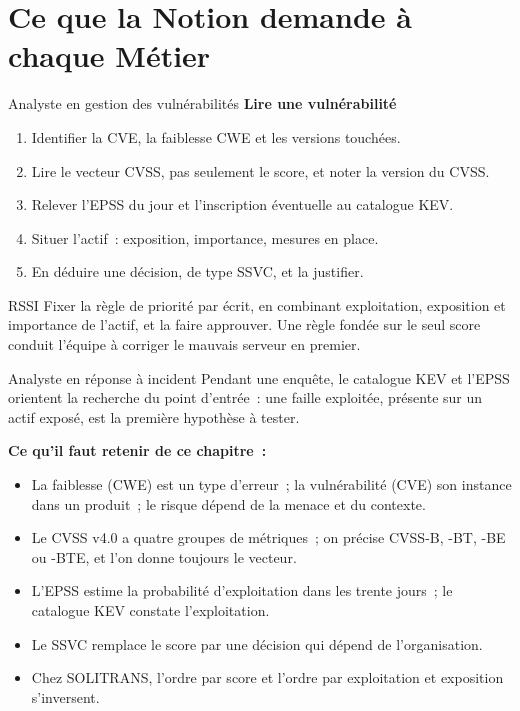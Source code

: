 \section{Ce que la Notion demande à chaque Métier}
\label{sec:c09-metiers}

\begin{boxmetier}{Analyste en gestion des vulnérabilités}
\textbf{Lire une vulnérabilité}
\begin{enumerate}
    \item Identifier la CVE, la faiblesse CWE et les versions touchées.
    \item Lire le vecteur CVSS, pas seulement le score, et noter la version
          du CVSS.
    \item Relever l'EPSS du jour et l'inscription éventuelle au catalogue
          KEV.
    \item Situer l'actif~: exposition, importance, mesures en place.
    \item En déduire une décision, de type SSVC, et la justifier.
\end{enumerate}
\end{boxmetier}

\begin{boxmetier}{RSSI}
Fixer la règle de priorité par écrit, en combinant exploitation, exposition
et importance de l'actif, et la faire approuver. Une règle fondée sur le
seul score conduit l'équipe à corriger le mauvais serveur en premier.
\end{boxmetier}

\begin{boxmetier}{Analyste en réponse à incident}
Pendant une enquête, le catalogue KEV et l'EPSS orientent la recherche du
point d'entrée~: une faille exploitée, présente sur un actif exposé, est la
première hypothèse à tester.
\end{boxmetier}

\separateur

\begin{boxresume}
\textbf{Ce qu'il faut retenir de ce chapitre~:}
\begin{itemize}
    \item La faiblesse (CWE) est un type d'erreur~; la vulnérabilité (CVE)
          son instance dans un produit~; le risque dépend de la menace et
          du contexte.
    \item Le CVSS v4.0 a quatre groupes de métriques~; on précise CVSS-B,
          -BT, -BE ou -BTE, et l'on donne toujours le vecteur.
    \item L'EPSS estime la probabilité d'exploitation dans les trente
          jours~; le catalogue KEV constate l'exploitation.
    \item Le SSVC remplace le score par une décision qui dépend de
          l'organisation.
    \item Chez SOLITRANS, l'ordre par score et l'ordre par exploitation et
          exposition s'inversent.
\end{itemize}
\end{boxresume}

